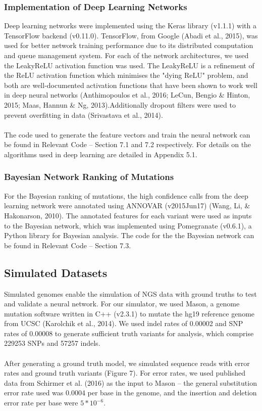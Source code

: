 \documentclass{article}
\begin{document}
\subsubsection{Implementation of Deep Learning Networks}
Deep learning networks were implemented using the Keras library (v1.1.1) with a TensorFlow backend (v0.11.0). TensorFlow, from Google (Abadi et al., 2015), was used for better network training performance due to its distributed computation and queue management system. For each of the network architectures, we used the LeakyReLU activation function was used. The LeakyReLU is a refinement of the ReLU activation function which minimises the "dying ReLU" problem, and both are well-documented activation functions that have been shown to work well in deep neural networks (Anthimopoulos et al., 2016; LeCun, Bengio \& Hinton, 2015; Maas, Hannun \& Ng, 2013).Additionally dropout filters were used to prevent overfitting in data (Srivastava et al., 2014).\\\\
The code used to generate the feature vectors and train the neural network can be found in Relevant Code -- Section 7.1 and 7.2 respectively. For details on the algorithms used in deep learning are detailed in  Appendix 5.1.
\subsubsection{Bayesian Network Ranking of Mutations}
For the Bayesian ranking of mutations, the high confidence calls from the deep learning network were annotated using ANNOVAR (v2015Jun17) (Wang, Li, \& Hakonarson, 2010). The annotated features for each variant were used as inputs to the Bayesian network, which was implemented using Pomegranate (v0.6.1), a Python library for Bayesian analysis. The code for the  the Bayesian network can be found in Relevant Code -- Section 7.3.
\subsection{Simulated Datasets}
Simulated genomes enable the simulation of NGS data with ground truths to test and validate a neural network. For our simulator, we used Mason, a genome mutation software written in C++ (v2.3.1) to mutate the hg19 reference genome from UCSC (Karolchik et al., 2014). We used indel rates of 0.00002 and SNP rates of 0.00008 to generate sufficient truth variants for analysis, which comprise 229253 SNPs and 57257 indels.\\\\
After generating a ground truth model, we simulated sequence reads with error rates and ground truth variants (Figure 7). For error rates, we used published data from Schirmer et al. (2016) as the input to Mason -- the general substitution error rate used was 0.0004 per base in the genome, and the insertion and deletion error rate per base were $5*10^{-6}$.
\end{document}

